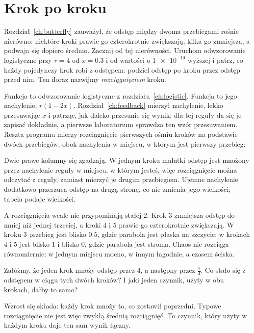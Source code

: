 \section{Krok po kroku}
\label{sec:ch07-stretch}

\noindent
Rozdział~\ref{ch:butterfly} zauważył, że odstęp między dwoma przebiegami
rośnie nierówno: niektóre kroki prawie go czterokrotnie zwiększają, kilka go
zmniejsza, a podwaja się dopiero średnio. Zacznij od tej nierówności.
Uruchom odwzorowanie logistyczne przy $r = 4$ od $x = \num{0.3}$ i od
wartości o $\num{1e-10}$ wyższej i patrz, co każdy pojedynczy krok robi z
odstępem: podziel odstęp po kroku przez odstęp przed nim. Ten iloraz nazwijmy
\emph{rozciągnięciem} kroku.


\noindent
Funkcja  to odwzorowanie logistyczne z
rozdziału~\ref{ch:logistic}. Funkcja  to jego nachylenie,
$r(1 - 2x)$. Rozdział~\ref{ch:feedback} mierzył nachylenie, lekko przesuwając
$x$ i patrząc, jak daleko przesunie się wynik; dla tej reguły da się je
zapisać dokładnie, a pierwsze laboratorium sprawdza ten wzór przesuwaniem.
Reszta programu mierzy rozciągnięcie pierwszych ośmiu kroków na podstawie
dwóch przebiegów, obok nachylenia w miejscu, w którym jest pierwszy przebieg:



\noindent
Dwie prawe kolumny się zgadzają. W jednym kroku malutki odstęp jest mnożony
przez nachylenie reguły w miejscu, w którym jesteś, więc rozciągnięcie można
odczytać z reguły, zamiast mierzyć je drugim przebiegiem. Ujemne nachylenie
dodatkowo przerzuca odstęp na drugą stronę, co nie zmienia jego wielkości;
tabela podaje wielkości.

A rozciągnięcia wcale nie przypominają stałej $2$. Krok $3$ zmniejsza odstęp
do mniej niż jednej trzeciej, a kroki $4$ i $5$ prawie go czterokrotnie
zwiększają. W kroku $3$ przebieg jest blisko $\num{0.5}$, gdzie parabola jest
płaska na szczycie; w krokach $4$ i $5$ jest blisko $1$ i blisko $0$, gdzie
parabola jest stroma. Chaos nie rozciąga równomiernie: w jednym miejscu
mocno, w innym łagodnie, a czasem ściska.

\begin{think}
Załóżmy, że jeden krok mnoży odstęp przez $4$, a następny przez $\tfrac14$.
Co stało się z odstępem w ciągu tych dwóch kroków? I jaki jeden czynnik,
użyty w obu krokach, dałby to samo?
\end{think}
Wzrost się składa: każdy krok mnoży to, co zostawił poprzedni. Typowe
rozciągnięcie nie jest więc zwykłą średnią rozciągnięć. To czynnik, który
użyty w każdym kroku daje ten sam wynik łączny.

